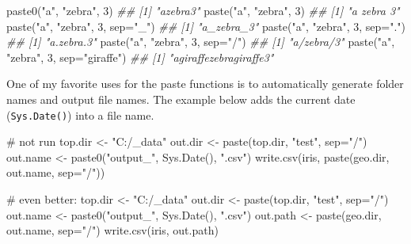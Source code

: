 \documentclass[
  13,
  letterpaper,
]{report}
\newenvironment{Shaded}{\begin{snugshade}}{\end{snugshade}}
\newcommand{\AttributeTok}[1]{\textcolor[rgb]{0.40,0.45,0.13}{#1}}
\newcommand{\CommentTok}[1]{\textcolor[rgb]{0.37,0.37,0.37}{#1}}
\newcommand{\DecValTok}[1]{\textcolor[rgb]{0.68,0.00,0.00}{#1}}
\newcommand{\DocumentationTok}[1]{\textcolor[rgb]{0.37,0.37,0.37}{\textit{#1}}}
\newcommand{\FunctionTok}[1]{\textcolor[rgb]{0.28,0.35,0.67}{#1}}
\newcommand{\NormalTok}[1]{\textcolor[rgb]{0.00,0.23,0.31}{#1}}
\newcommand{\OtherTok}[1]{\textcolor[rgb]{0.00,0.23,0.31}{#1}}
\newcommand{\StringTok}[1]{\textcolor[rgb]{0.13,0.47,0.30}{#1}}
\begin{document}
\begin{Shaded}
\begin{Highlighting}[]

\FunctionTok{paste0}\NormalTok{(}\StringTok{"a"}\NormalTok{, }\StringTok{"zebra"}\NormalTok{, }\DecValTok{3}\NormalTok{)}
\DocumentationTok{\#\# [1] "azebra3"}
\FunctionTok{paste}\NormalTok{(}\StringTok{"a"}\NormalTok{, }\StringTok{"zebra"}\NormalTok{, }\DecValTok{3}\NormalTok{)}
\DocumentationTok{\#\# [1] "a zebra 3"}
\FunctionTok{paste}\NormalTok{(}\StringTok{"a"}\NormalTok{, }\StringTok{"zebra"}\NormalTok{, }\DecValTok{3}\NormalTok{, }\AttributeTok{sep=}\StringTok{"\_"}\NormalTok{)}
\DocumentationTok{\#\# [1] "a\_zebra\_3"}
\FunctionTok{paste}\NormalTok{(}\StringTok{"a"}\NormalTok{, }\StringTok{"zebra"}\NormalTok{, }\DecValTok{3}\NormalTok{, }\AttributeTok{sep=}\StringTok{"."}\NormalTok{)}
\DocumentationTok{\#\# [1] "a.zebra.3"}
\FunctionTok{paste}\NormalTok{(}\StringTok{"a"}\NormalTok{, }\StringTok{"zebra"}\NormalTok{, }\DecValTok{3}\NormalTok{, }\AttributeTok{sep=}\StringTok{"/"}\NormalTok{)}
\DocumentationTok{\#\# [1] "a/zebra/3"}
\FunctionTok{paste}\NormalTok{(}\StringTok{"a"}\NormalTok{, }\StringTok{"zebra"}\NormalTok{, }\DecValTok{3}\NormalTok{, }\AttributeTok{sep=}\StringTok{"giraffe"}\NormalTok{)}
\DocumentationTok{\#\# [1] "agiraffezebragiraffe3"}
\end{Highlighting}
\end{Shaded}

One of my favorite uses for the paste functions is to automatically
generate folder names and output file names. The example below adds the
current date (\texttt{Sys.Date()}) into a file name.

\begin{Shaded}
\begin{Highlighting}[]
\CommentTok{\# not run}
\NormalTok{top.dir }\OtherTok{\textless{}{-}} \StringTok{"C:/\_data"}
\NormalTok{out.dir }\OtherTok{\textless{}{-}} \FunctionTok{paste}\NormalTok{(top.dir, }\StringTok{"test"}\NormalTok{, }\AttributeTok{sep=}\StringTok{"/"}\NormalTok{)}
\NormalTok{out.name }\OtherTok{\textless{}{-}} \FunctionTok{paste0}\NormalTok{(}\StringTok{"output\_"}\NormalTok{, }\FunctionTok{Sys.Date}\NormalTok{(), }\StringTok{".csv"}\NormalTok{)}
\FunctionTok{write.csv}\NormalTok{(iris, }\FunctionTok{paste}\NormalTok{(geo.dir, out.name, }\AttributeTok{sep=}\StringTok{"/"}\NormalTok{))}

\CommentTok{\# even better:}
\NormalTok{top.dir }\OtherTok{\textless{}{-}} \StringTok{"C:/\_data"}
\NormalTok{out.dir }\OtherTok{\textless{}{-}} \FunctionTok{paste}\NormalTok{(top.dir, }\StringTok{"test"}\NormalTok{, }\AttributeTok{sep=}\StringTok{"/"}\NormalTok{)}
\NormalTok{out.name }\OtherTok{\textless{}{-}} \FunctionTok{paste0}\NormalTok{(}\StringTok{"output\_"}\NormalTok{, }\FunctionTok{Sys.Date}\NormalTok{(), }\StringTok{".csv"}\NormalTok{)}
\NormalTok{out.path }\OtherTok{\textless{}{-}} \FunctionTok{paste}\NormalTok{(geo.dir, out.name, }\AttributeTok{sep=}\StringTok{"/"}\NormalTok{)}
\FunctionTok{write.csv}\NormalTok{(iris, out.path)}
\end{Highlighting}
\end{Shaded}
\end{document}
